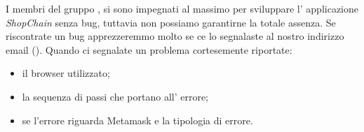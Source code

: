 I membri del gruppo \groupName{}, si sono impegnati al massimo per sviluppare l' applicazione \textit{ShopChain} senza bug, tuttavia non possiamo garantirne la totale assenza.
Se riscontrate un bug apprezzeremmo molto se ce lo segnalaste al nostro indirizzo email (\groupEmail{}).
Quando ci segnalate un problema cortesemente riportate:
\begin{itemize}
    \item il browser utilizzato;
    \item la sequenza di passi che portano all' errore;
    \item se l'errore riguarda Metamask\glo{} e la tipologia di errore.
\end{itemize}
